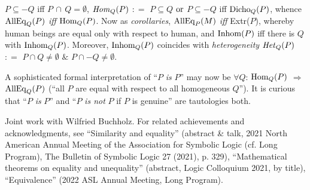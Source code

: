 \documentclass[bsl,meeting]{asl}
\begin{document}
$ P \subseteq - Q $ 
iff
$ P \, \cap \, Q = \emptyset $, 
$ {\it Hom} _Q ( P ) $
$ : = $ 
$ P \subseteq Q $
$ \rm or $ 
$ P \subseteq - Q $
iff
$ {\rm Dicho} _Q ( P ) $,
whence
$ {\rm AllEq} _Q (P) $ 
{\it iff}
$ {\rm Hom} _Q ( P ) $. 
Now as {\it corollaries}, 
$ {\rm AllEq} _P ( M ) $ 
{\it iff} 
Extr($ P $),
whereby 
human beings are equal only with respect to human, 
and 
$ {\rm Inhom} ( P ) $
iff
there is 
$ Q $
with
$ {\rm Inhom} _Q ( P ) $.
Moreover, 
$ {\rm Inhom} _Q ( P ) $
coincides 
with 
{\it heterogeneity}
$ {\it Het} _Q ( P ) $
$ : = $
$ P \cap Q \neq \emptyset $ 
$ \& $ 
$ P \cap - Q \neq \emptyset $. 
\par
A sophisticated formal interpretation of 
``$ P $ {\it is} $ P $''
may now be 
$ \forall Q $: 
$ {\rm Hom} _Q ( P ) $ 
$ \Rightarrow $
$ {\rm AllEq} _Q ( P ) $
(``all $ P $ are equal with respect to all homogeneous $ Q $''). 
It is curious that 
``$ P $ {\it is} $ P $''
and 
``$ P $ {\it is not} $ P $ if $ P $ is genuine''
are tautologies both. 
\par 
Joint work with Wilfried Buchholz.
For related achievements and acknowledgments, 
see 
``Similarity and equality'' 
(abstract \& talk, 
2021 North American Annual Meeting of the Association for Symbolic Logic 
(cf. Long Program),
The Bulletin of Symbolic Logic 27 (2021), p. 329),
``Mathematical theorems on equality and unequality''
(abstract, 
Logic Colloquium 2021, 
by title), 
``Equivalence''
(2022 ASL Annual Meeting, 
Long Program). 
\end{document}
